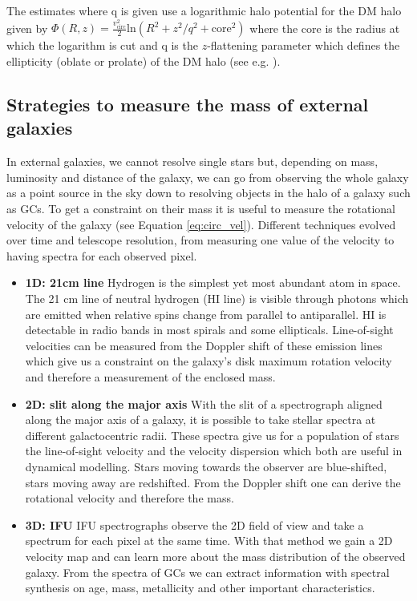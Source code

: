  The estimates where q is given use a logarithmic halo potential for the \ac{DM} halo given by $\Phi(R,z) = \frac{v_\mathrm{circ}^2}{2} \mathrm{ln}(R^2 +z^2/q^2 + \mathrm{core}^2)$ where the core is the radius at which the logarithm is cut and q is the $z$-flattening parameter which defines the ellipticity (oblate or prolate) of the \ac{DM} halo (see e.g. \citealp{Malhan...GD1stream...2018}).  

\subsection{Strategies to measure the mass of external galaxies}\label{subsec:mass_est_ext}
In external galaxies, we cannot resolve single stars but, depending on mass, luminosity and distance of the galaxy, we can go from observing the whole galaxy as a point source in the sky down to resolving objects in the halo of a galaxy such as \acp{GC}. To get a constraint on their mass it is useful to measure the rotational velocity of the galaxy (see Equation \ref{eq:circ_vel}). Different techniques evolved over time and telescope resolution, from measuring one value of the velocity to having spectra for each observed pixel.
\begin{itemize}
    \item\textbf{1D: 21cm line} Hydrogen is the simplest yet most abundant atom in space. The 21 cm line of neutral hydrogen (HI line) is visible through photons which are emitted when relative spins change from parallel to antiparallel. HI is detectable in radio bands in most spirals and some ellipticals. Line-of-sight velocities can be measured from the Doppler shift of these emission lines which give us a constraint on the galaxy's disk maximum rotation velocity and therefore a measurement of the enclosed mass.
    \item\textbf{2D: slit along the major axis} With the slit of a spectrograph aligned along the major axis of a galaxy, it is possible to take stellar spectra at different galactocentric radii. These spectra give us for a population of stars the line-of-sight velocity and the velocity dispersion which both are useful in dynamical modelling. Stars moving towards the observer are blue-shifted, stars moving away are redshifted. From the Doppler shift one can derive the rotational velocity and therefore the mass. 
    \item \textbf{3D: \acl{IFU}} \ac{IFU} spectrographs observe the 2D field of view and take a spectrum for each pixel at the same time. With that method we gain a 2D velocity map and can learn more about the mass distribution of the observed galaxy. From the spectra of \acp{GC} we can extract information with spectral synthesis on age, mass, metallicity and other important characteristics. 
\end{itemize}

